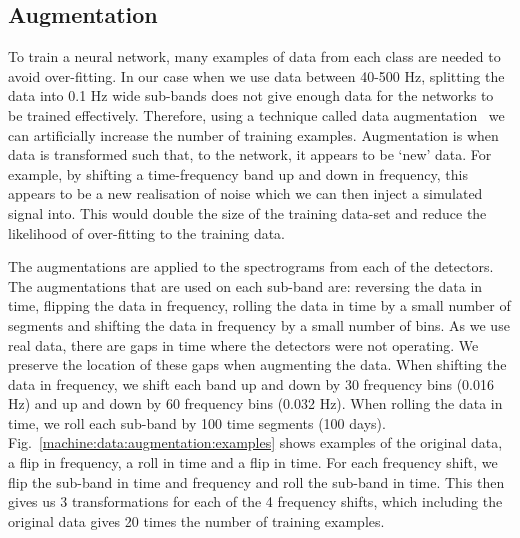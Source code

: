 \subsection{\label{machine:data:augmentation} Augmentation}

%
To train a neural network, many examples of data from each class are needed to avoid over-fitting.
In our case when we use data between 40-500 Hz, splitting the data into 0.1 Hz wide sub-bands does not give enough data for the
networks to be trained effectively. Therefore, using a technique called data
augmentation~\cite{patrice1991TangentProp,baird1992DocumentImage} we can
artificially increase the number of training examples.
Augmentation is when data is transformed such that, to the network, it appears to be `new'
data. 
For example, by shifting a time-frequency band up and down in frequency, this appears to be a new realisation of noise which we can then inject a simulated signal into.
This would double the size of the training data-set and reduce the likelihood of over-fitting to the training data. 

%
The augmentations are applied to the spectrograms from each of the detectors.
The augmentations that are used on each sub-band are: reversing the data in
time, flipping the data in frequency, rolling the data in time by a small
number of segments and shifting the data in frequency by a small number of
bins. As we use real data, there are gaps in time where the detectors were not
operating. We preserve the location of these gaps when augmenting the data.
When shifting the data in frequency, we shift each band up and down by 30 frequency bins (0.016 Hz) and up and down by 60 frequency bins (0.032 Hz).
When rolling the data in time, we roll each sub-band by 100 time segments (100 days). 
Fig.~\ref{machine:data:augmentation:examples} shows examples of the original data, a flip in frequency, a roll in time and a flip in time.
For each frequency shift, we flip the sub-band in time and frequency and roll the sub-band in time.
This then gives us 3 transformations for each of the 4 frequency shifts, which including the original data gives 20 times the number of training examples.

